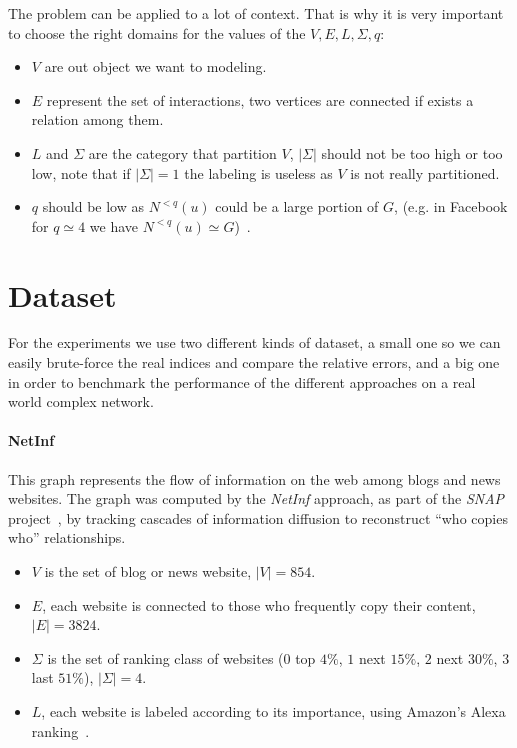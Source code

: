 The problem can be applied to a lot of context.
That is why it is very important to choose the right domains for the values of the $V, E, L, \Sigma, q$:
\begin{itemize}
	\item $V$ are out object we want to modeling.
	\item $E$ represent the set of interactions, two vertices are connected if exists a relation among them.
	\item $L$ and $\Sigma$ are the category that partition $V$, $|\Sigma|$ should not be too high or too low, note that if $|\Sigma| = 1$ the labeling is useless as $V$ is not really partitioned.
	\item $q$ should be low as $N^{<q}(u)$ could be a large portion of $G$, (e.g. in Facebook for $q \simeq 4$ we have $N^{<q}(u) \simeq G$)~\cite{Facebook}.
\end{itemize}

\section{Dataset}

For the experiments we use two different kinds of dataset, a small one so we can easily brute-force the real indices and compare the relative errors, and a big one in order to benchmark the performance of the different approaches on a real world complex network.

\paragraph*{NetInf} This graph represents the flow of information on the web among blogs and news websites. The graph was computed by the \textit{NetInf} approach, as part of the \textit{SNAP} project~\cite{netinf}, by tracking cascades of information diffusion to reconstruct ``who copies who'' relationships.

\begin{itemize}
	\item $V$ is the set of blog or news website, $|V| = 854$.
	\item $E$, each website is connected to those who frequently copy their content, $|E| = 3824$.
	\item $\Sigma$ is the set of ranking class of websites ($0$ top $4\%$, $1$ next $15\%$, $2$ next $30\%$, $3$ last $51\%$), $|\Sigma| = 4$.
	\item $L$, each website is labeled according to its importance, using Amazon's Alexa ranking~\cite{alexarank}.
\end{itemize}

